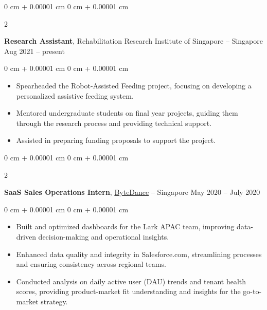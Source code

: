 \documentclass[10pt, letterpaper]{article}
\newenvironment{highlights}{
    \begin{itemize}[
        topsep=0.10 cm,
        parsep=0.10 cm,
        partopsep=0pt,
        itemsep=0pt,
        leftmargin=0 cm + 10pt
    ]
}{
    \end{itemize}
} %
\newenvironment{onecolentry}{
    \begin{adjustwidth}{
        0 cm + 0.00001 cm
    }{
        0 cm + 0.00001 cm
    }
}{
    \end{adjustwidth}
} %
\newenvironment{twocolentry}[2][]{
    \onecolentry
    \def\secondColumn{#2}
    \setcolumnwidth{\fill, 4.5 cm}
    \begin{paracol}{2}
}{
    \switchcolumn \raggedleft \secondColumn
    \end{paracol}
    \endonecolentry
} %
\begin{document}
        
        \begin{twocolentry}{
            Aug 2021 – present
        }
            \textbf{Research Assistant}, Rehabilitation Research Institute of Singapore -- Singapore\end{twocolentry}

        \vspace{0.10 cm}
        \begin{onecolentry}
            \begin{highlights}
                \item Spearheaded the Robot-Assisted Feeding project, focusing on developing a personalized assistive feeding system.
                \item Mentored undergraduate students on final year projects, guiding them through the research process and providing technical support.
                \item Assisted in preparing funding proposals to support the project.
            \end{highlights}
        \end{onecolentry}


        \vspace{0.2 cm}

        \begin{twocolentry}{
            May 2020 – July 2020
        }
            \textbf{SaaS Sales Operations Intern}, \href{https://www.bytedance.com/en/}{ByteDance} -- Singapore\end{twocolentry}

        \vspace{0.10 cm}
        \begin{onecolentry}
            \begin{highlights}
                \item Built and optimized dashboards for the Lark APAC team, improving data-driven decision-making and operational insights.
                \item Enhanced data quality and integrity in Salesforce.com, streamlining processes and ensuring consistency across regional teams.
                \item Conducted analysis on daily active user (DAU) trends and tenant health scores, providing product-market fit understanding and insights for the go-to-market strategy.
            \end{highlights}
        \end{onecolentry}


        \vspace{0.2 cm}
\end{document}
